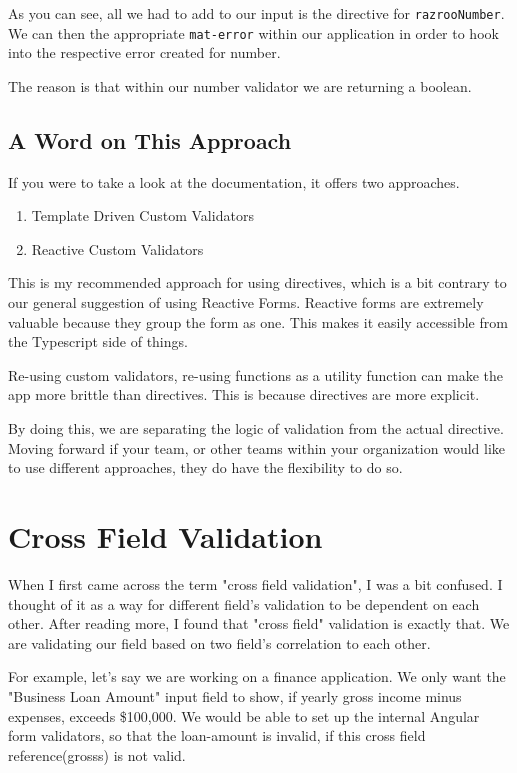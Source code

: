 As you can see, all we had to add to our input is the directive for 
\lstinline{razrooNumber}. We can then the appropriate \lstinline{mat-error}
within our application in order to hook into the respective error created for number.

The reason is that within our number validator we are returning a 
boolean. 

\subsection{A Word on This Approach}
If you were to take a look at the documentation, it offers two approaches.
\begin{enumerate}
  \item Template Driven Custom Validators 
  \item Reactive Custom Validators 
\end{enumerate}

This is my recommended approach for using directives, which is a bit contrary to our general suggestion of using Reactive Forms. Reactive forms are extremely valuable because they group the form as one. This makes it easily accessible from the Typescript side of things. 

Re-using custom validators, re-using functions as a utility function can make the app more brittle than directives. This is because directives are more explicit. 

By doing this, we are separating the logic of validation from the actual directive. Moving forward if your team, or other teams within your organization would like to use different approaches, they do have the flexibility to do so. 

\section{Cross Field Validation}
When I first came across the term "cross field validation", I was a bit confused. I thought of it as a way for different field's validation to be dependent on each other. After reading more, I found that "cross field" validation is exactly that. We are validating our field based on two field's correlation to each other. 

For example, let's say we are working on a finance application. We only want the "Business Loan Amount" input field to show, if yearly gross income minus expenses, exceeds \$100,000. We would be able to set up the internal Angular form validators, so that the loan-amount is invalid, if this cross field reference(grosss) is not valid. 

